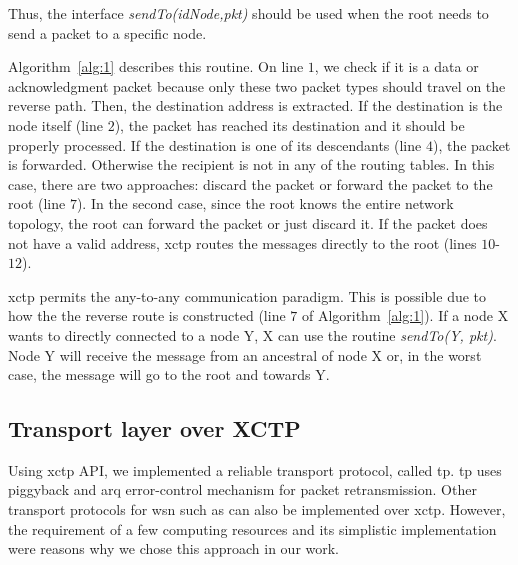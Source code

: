 Thus, the interface \textit{sendTo(idNode,pkt)} should be used when the root needs to send a packet to a specific node.

Algorithm~\ref{alg:1} describes this routine. On line $1$, we check if it is a data or acknowledgment packet because only these two packet types should travel on the reverse path. Then, the destination address is extracted. If the destination is the node itself (line $2$), the packet has reached its destination and it should be properly processed. If the destination is one of its descendants (line $4$), the packet is forwarded. Otherwise the recipient is not in any of the routing tables. In this case, there are two approaches: discard the packet or forward the packet to the root (line $7$). In the second case, since the root knows the entire network topology, the root can forward the packet or just discard it. If the packet does not have a valid address, \ac{xctp} routes the messages directly to the root (lines $10$-$12$).

\ac{xctp} permits the any-to-any communication paradigm. This is possible due to how the the reverse route is constructed (line $7$ of Algorithm~\ref{alg:1}). If a node X wants to directly connected to a node Y, X can use the routine \textit{sendTo(Y, pkt)}. Node Y will receive the message from an ancestral of node X or, in the worst case, the message will go to the root and towards Y.


\subsection{Transport layer over XCTP}
\label{sec:transport-layer-over-xctp}

Using \ac{xctp} API, we implemented a reliable transport protocol, called \ac{tp}. \ac{tp} uses piggyback and \ac{arq} error-control mechanism for packet retransmission. Other transport protocols for \ac{wsn} such as \cite{RCRT, flush, STCP} can also be implemented over \ac{xctp}. However, the requirement of a few computing resources and its simplistic implementation were reasons why we chose this approach in our work.

